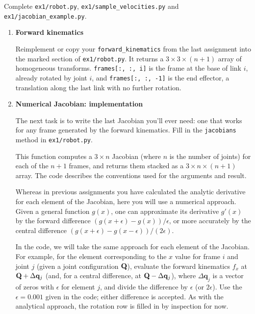 \documentclass{16384_doc}
\begin{document}
\begin{questions}

    Complete \verb!ex1/robot.py!, \verb!ex1/sample_velocities.py! and
    \verb!ex1/jacobian_example.py!.

    \begin{enumerate}  [label=\alph*.]
        \item \text{[15 points]} \textbf{Forward kinematics}

        Reimplement or copy your \verb!forward_kinematics! from the last assignment into the
        marked section of \verb!ex1/robot.py!. It returns a $3 \times 3 \times
        (n+1)$ array of homogeneous transforms. \verb!frames[:, :, i]! is the
        frame at the base of link $i$, already rotated by joint $i$, and
        \verb!frames[:, :, -1]! is the end effector, a translation along the last
        link with no further rotation.

        \item \text{[15 points]} \textbf{Numerical Jacobian: implementation}

        The next task is to write the last Jacobian you'll ever need: one that
        works for any frame generated by the forward kinematics. Fill in the
        \verb!jacobians! method in \verb!ex1/robot.py!.

        This function computes a $3 \times n$ Jacobian (where $n$ is the number of
        joints) for each of the $n+1$ frames, and returns them stacked as a
        $3 \times n \times (n+1)$ array. The code describes the conventions used
        for the arguments and result.

        Whereas in previous assignments you have calculated the analytic
        derivative for each element of the Jacobian, here you will use a
        numerical approach. Given a general function $g(x)$, one can approximate
        its derivative $g'(x)$ by the forward difference
        $(g(x+\epsilon) - g(x)) / \epsilon$, or more accurately by the central
        difference $(g(x+\epsilon) - g(x-\epsilon)) / (2\epsilon)$.

        In the code, we will take the same approach for each element of the
        Jacobian. For example, for the element corresponding to the $x$ value for
        frame $i$ and joint $j$ (given a joint configuration $\mathbf{Q}$), evaluate the
        forward kinematics $f_x$ at $\mathbf{Q} + \Delta \mathbf{q}_j$ (and, for a central
        difference, at $\mathbf{Q} - \Delta \mathbf{q}_j$), where $\Delta \mathbf{q}_j$
        is a vector of zeros with $\epsilon$ for element $j$, and divide the
        difference by $\epsilon$ (or $2\epsilon$). Use the $\epsilon = 0.001$
        given in the code; either difference is accepted. As with the analytical
        approach, the rotation row is filled in by inspection for now.


\end{enumerate}
\end{questions}
\end{document}
